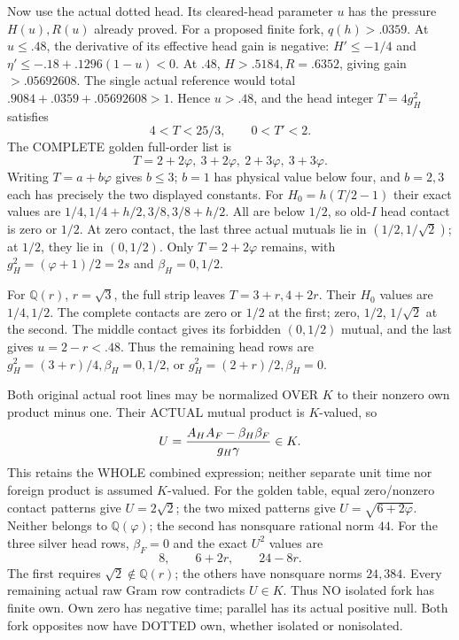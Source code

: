\documentclass[11pt]{article}
\begin{document}
Now use the actual dotted head.
Its cleared-head parameter \(u\) has
the pressure \(H(u),R(u)\) already proved.
For a proposed finite fork, \(q(h)>.0359\).
At \(u\le.48\), the derivative of its
effective head gain is negative:
\(H'\le-1/4\) and
\(\eta'\le-.18+.1296(1-u)<0\).
At \(.48\), \(H>.5184,R=.6352\),
giving gain \(>.05692608\).
The single actual reference would total
\(.9084+.0359+.05692608>1\).
Hence \(u>.48\), and the head integer
\(T=4g_H^2\) satisfies
\[
                         4<T<25/3,\qquad0<T'<2 .
\]
The COMPLETE golden full-order list is
\[
                         T=2+2\varphi,\ 3+2\varphi,\ 2+3\varphi,\ 3+3\varphi .
\]
Writing \(T=a+b\varphi\) gives \(b\le3\);
\(b=1\) has physical value below four,
and \(b=2,3\) each has precisely the
two displayed constants.
For \(H_0=h(T/2-1)\) their exact values
are \(1/4,1/4+h/2,3/8,3/8+h/2\).
All are below \(1/2\), so old-\(I\)
head contact is zero or \(1/2\).
At zero contact, the last three actual
mutuals lie in \((1/2,1/\sqrt2)\);
at \(1/2\), they lie in \((0,1/2)\).
Only \(T=2+2\varphi\) remains, with
\(g_H^2=(\varphi+1)/2=2s\) and
\(\beta_H=0,1/2\).

For \(\mathbb Q(r)\), \(r=\sqrt3\),
the full strip leaves \(T=3+r,4+2r\).
Their \(H_0\) values are \(1/4,1/2\).
The complete contacts are zero or
\(1/2\) at the first; zero, \(1/2\),
\(1/\sqrt2\) at the second.
The middle contact gives its forbidden
\((0,1/2)\) mutual, and the last gives
\(u=2-r<.48\).
Thus the remaining head rows are
\(g_H^2=(3+r)/4,\beta_H=0,1/2\),
or \(g_H^2=(2+r)/2,\beta_H=0\).

Both original actual root lines may
be normalized OVER \(K\) to their
nonzero own product minus one.
Their ACTUAL mutual product is \(K\)-valued,
so
\[
                  U={A_HA_F-\beta_H\beta_F\over g_H\gamma}\in K .
\]
This retains the WHOLE combined expression;
neither separate unit time nor foreign
product is assumed \(K\)-valued.
For the golden table, equal zero/nonzero
contact patterns give \(U=2\sqrt2\);
the two mixed patterns give
\(U=\sqrt{6+2\varphi}\).
Neither belongs to \(\mathbb Q(\varphi)\);
the second has nonsquare rational norm
\(44\).
For the three silver head rows,
\(\beta_F=0\) and the exact \(U^2\) values
are
\[
                             8,\qquad6+2r,\qquad24-8r .
\]
The first requires \(\sqrt2\notin\mathbb Q(r)\);
the others have nonsquare norms \(24,384\).
Every remaining actual raw Gram row
contradicts \(U\in K\).
Thus NO isolated fork has finite own.
Own zero has negative time; parallel
has its actual positive null.
Both fork opposites now have DOTTED
own, whether isolated or nonisolated.
\end{document}
